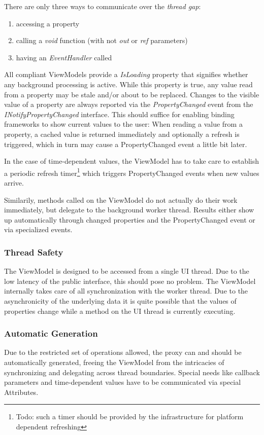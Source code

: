 There are only three ways to communicate over the \emph{thread gap}:
\begin{enumerate}
\item{accessing a property}
\item{calling a \emph{void} function (with not \emph{out} or \emph{ref} parameters)}
\item{having an \emph{EventHandler} called}
\end{enumerate}

All compliant ViewModels provide a \emph{IsLoading} property that signifies
whether any background processing is active. While this property is true, any
value read from a property may be stale and/or about to be replaced. Changes to
the visible value of a property are always reported via the
\emph{PropertyChanged} event from the \emph{INotifyPropertyChanged} interface.
This should suffice for enabling binding frameworks to show current values to
the user: When reading a value from a property, a cached value is returned
immediately and optionally a refresh is triggered, which in turn may cause a
PropertyChanged event a little bit later.

In the case of time-dependent values, the ViewModel has to take care
to establish a periodic refresh timer\footnote{Todo: such a timer should be
provided by the infrastructure for platform dependent refreshing} which
triggers PropertyChanged events when new values arrive.

Similarily, methods called on the ViewModel do not actually do their work
immediately, but delegate to the background worker thread. Results either show
up automatically through changed properties and the PropertyChanged event or
via specialized events.

\subsubsection{Thread Safety}

The ViewModel is designed to be accessed from a single UI thread. Due to the
low latency of the public interface, this should pose no problem. The ViewModel
internally takes care of all synchronization with the worker thread. Due to the
asynchronicity of the underlying data it is quite possible that the values of
properties change while a method on the UI thread is currently executing.

\subsubsection{Automatic Generation}

Due to the restricted set of operations allowed, the proxy can and should be
automatically generated, freeing the ViewModel from the intricacies of
synchronizing and delegating across thread boundaries. Special needs like
callback parameters and time-dependent values have to be communicated via
special Attributes.

